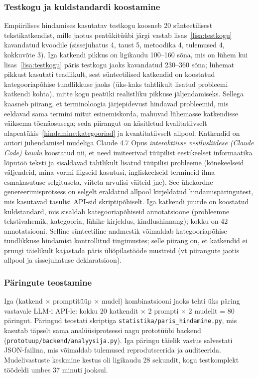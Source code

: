 \subsubsection{Testkogu ja kuldstandardi koostamine}

Empiirilises hindamises kasutatav testkogu koosneb 20 sünteetilisest tekstikatkendist, mille jaotus peatükitüübi järgi vastab lisas~\ref{lisa:testkogu} kavandatud kvoodile (sissejuhatus 4, taust 5, metoodika 4, tulemused 4, kokkuvõte 3). Iga katkendi pikkus on ligikaudu 100--160 sõna, mis on lühem kui lisas~\ref{lisa:testkogu} päris testkogu jaoks kavandatud 230--360 sõna; lühemat pikkust kasutati teadlikult, sest sünteetilised katkendid on koostatud kategooriapõhise tundlikkuse jaoks (üks-kaks tahtlikult lisatud probleemi katkendi kohta), mitte kogu peatüki realistliku pikkuse jäljendamiseks. Sellega kaasneb piirang, et terminoloogia järjepidevust hindavad probleemid, mis eeldavad sama termini mitut esinemiskorda, mahuvad lühemasse katkendisse väiksema tõenäosusega; seda piirangut on käsitletud kvalitatiivselt alapeatükis~\ref{hindamine:kategooriad} ja kvantitatiivselt allpool. Katkendid on autori juhendamisel mudeliga Claude 4.7 Opus \emph{interaktiivse vestlusliidese (Claude Code) kaudu} koostatud nii, et need imiteerivad tüüpilist eestikeelset informaatika lõputöö teksti ja sisaldavad tahtlikult lisatud tüüpilisi probleeme (kõnekeelseid väljendeid, mina-vormi liigseid kasutusi, ingliskeelseid termineid ilma esmakasutuse selgituseta, viiteta arvulisi väiteid jne). See ühekordne genereerimisprotsess on selgelt eraldatud allpool kirjeldatud hindamispäringutest, mis kasutavad tasulisi API-sid skriptipõhiselt. Iga katkendi juurde on koostatud kuldstandard, mis sisaldab kategooriapõhiseid annotatsioone (probleemne tekstivahemik, kategooria, lühike kirjeldus, kindlushinnang); kokku on 42 annotatsiooni. Selline sünteetiline andmestik võimaldab kategooriapõhise tundlikkuse hindamist kontrollitud tingimustes; selle piirang on, et katkendid ei pruugi täielikult kajastada päris üliõpilastööde mustreid (vt piirangute jaotis allpool ja sissejuhatuse deklaratsioon).

\subsubsection{Päringute teostamine}

Iga (katkend × promptitüüp × mudel) kombinatsiooni jaoks tehti üks päring vastavale LLM-i API-le: kokku 20 katkendit × 2 prompti × 2 mudelit = 80 päringut. Päringud teostati skriptiga \texttt{statistika/paris\_hindamine.py}, mis kasutab täpselt sama analüüsiprotsessi nagu prototüübi backend (\texttt{prototuup/backend/analyysija.py}). Iga päringu täielik vastus salvestati JSON-failina, mis võimaldab tulemused reprodutseerida ja auditeerida. Mudelivastuste keskmine kestus oli ligikaudu 28 sekundit, kogu testkomplekt töödeldi umbes 37 minuti jooksul.

